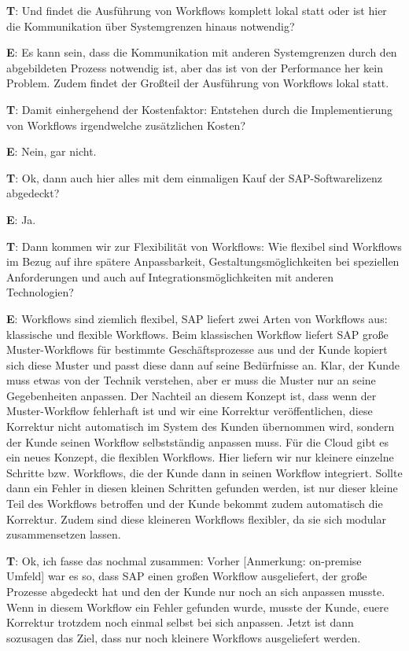\begin{list}{X:}{\setlength{\labelsep}{5mm}}
 \item[\textbf{T}:] Und findet die Ausführung von Workflows komplett lokal statt oder ist hier die Kommunikation über Systemgrenzen hinaus notwendig?
 \item[\textbf{E}:] Es kann sein, dass die Kommunikation mit anderen Systemgrenzen durch den abgebildeten Prozess notwendig ist, aber das ist von der Performance her kein Problem. Zudem findet der Gro{\ss}teil der Ausführung von Workflows lokal statt.
 \item[\textbf{T}:] Damit einhergehend der Kostenfaktor: Entstehen durch die Implementierung von Workflows irgendwelche zusätzlichen Kosten?
 \item[\textbf{E}:] Nein, gar nicht.
 \item[\textbf{T}:] Ok, dann auch hier alles mit dem einmaligen Kauf der SAP-Softwarelizenz abgedeckt?
 \item[\textbf{E}:] Ja.
 \item[\textbf{T}:] Dann kommen wir zur Flexibilität von Workflows: Wie flexibel sind Workflows im Bezug auf ihre spätere Anpassbarkeit, Gestaltungsmöglichkeiten bei speziellen Anforderungen und auch auf Integrationsmöglichkeiten mit anderen Technologien?
 \item[\textbf{E}:] Workflows sind ziemlich flexibel, SAP liefert zwei Arten von Workflows aus: klassische und flexible Workflows. Beim klassischen Workflow liefert SAP gro{\ss}e Muster-Workflows für bestimmte Geschäftsprozesse aus und der Kunde kopiert sich diese Muster und passt diese dann auf seine Bedürfnisse an. Klar, der Kunde muss etwas von der Technik verstehen, aber er muss die Muster nur an seine Gegebenheiten anpassen. Der Nachteil an diesem Konzept ist, dass wenn der Muster-Workflow fehlerhaft ist und wir eine Korrektur veröffentlichen, diese Korrektur nicht automatisch im System des Kunden übernommen wird, sondern der Kunde seinen Workflow selbstständig anpassen muss. Für die Cloud gibt es ein neues Konzept, die flexiblen Workflows. Hier liefern wir nur kleinere einzelne Schritte bzw. Workflows, die der Kunde dann in seinen Workflow integriert. Sollte dann ein Fehler in diesen kleinen Schritten gefunden werden, ist nur dieser kleine Teil des Workflows betroffen und der Kunde bekommt zudem automatisch die Korrektur. Zudem sind diese kleineren Workflows flexibler, da sie sich modular zusammensetzen lassen.
 \item[\textbf{T}:] Ok, ich fasse das nochmal zusammen: Vorher [Anmerkung: on-premise Umfeld] war es so, dass SAP einen gro{\ss}en Workflow ausgeliefert, der gro{\ss}e Prozesse abgedeckt hat und den der Kunde nur noch an sich anpassen musste. Wenn in diesem Workflow ein Fehler gefunden wurde, musste der Kunde, euere Korrektur trotzdem noch einmal selbst bei sich anpassen. Jetzt ist dann sozusagen das Ziel, dass nur noch kleinere Workflows ausgeliefert werden.

\end{list}

